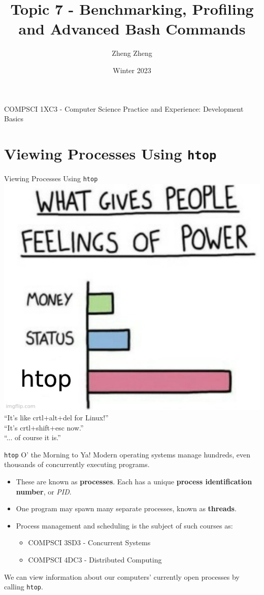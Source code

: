 \documentclass[11pt]{beamer}
\author{Zheng Zheng}
\title{Topic 7 - Benchmarking, Profiling and Advanced Bash Commands}
\institute{McMaster University}
\date{Winter 2023}
\begin{document}
\begin{frame}
\center
COMPSCI 1XC3 - Computer Science Practice and Experience:
Development Basics
\titlepage
\end{frame}

\begin{frame}
\tableofcontents
\end{frame}

\section[htop]{Viewing Processes Using \texttt{htop}}
\begin{frame}{Viewing Processes Using \texttt{htop}}
\center
\includegraphics[scale=0.25]{htop.jpg} \\
``It's like crtl+alt+del for Linux!''  \\
``It's crtl+shift+esc now.'' \\
``... of course it is.''
\end{frame}

\begin{frame}{\texttt{htop} O' the Morning to Ya!}
Modern operating systems manage hundreds, even thousands of concurrently executing programs.
\begin{itemize}
\item These are known as \textbf{processes}.  Each has a unique \textbf{process identification number}, or \emph{PID}.
\item One program may spawn many separate processes, known as \textbf{threads}.
\item Process management and scheduling is the subject of such courses as:
\begin{itemize}
\item COMPSCI 3SD3 - Concurrent Systems
\item COMPSCI 4DC3 - Distributed Computing
\end{itemize}
\end{itemize}
We can view information about our computers' currently open processes by calling \texttt{htop}.
\end{frame}
\end{document}

